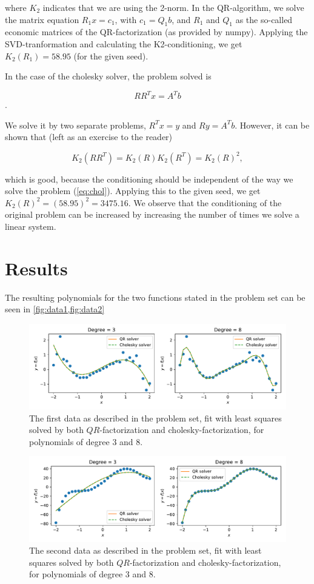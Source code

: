 \documentclass[a11paper, 10pt]{article}
\begin{document}
where $K_2$ indicates that we are using the 2-norm. In the QR-algorithm,
we solve the matrix equation $R_1x = c_1$, with $c_1 = Q_1 b$, and $R_1$
and $Q_1$ as the so-called economic matrices of the QR-factorization (as
provided by numpy). Applying the SVD-tranformation and calculating the K2-conditioning, we
get $K_2(R_1) = 58.95$ (for the given seed).

In the case of the cholesky solver, the problem solved is 

\begin{equation}
    RR^T x = A^T b
\end{equation}.

We solve it by two separate problems, $R^T x = y$ and $Ry = A^Tb$. However,
it can be shown that (left as an exercise to the reader)

\begin{equation}\label{eq:chol}
    K_2(RR^T) = K_2(R) K_2(R^T) = K_2(R)^2,
\end{equation}

which is good, because the conditioning should be independent of the way we
solve the problem (\cref{eq:chol}). Applying this to the given seed, we get
$K_2(R)^2 = (58.95)^2 = 3475.16$. We observe that the conditioning of the
original problem can be increased by increasing the number of times we
solve a linear system. 


\section{Results}

The resulting polynomials for the two functions stated in the problem set
can be seen in \cref{fig:data1,fig:data2}


\begin{figure}[htpb]
    \centering
    \includegraphics[width=0.8\linewidth]{data1.pdf}
    \caption{The first data as described in the problem set, fit with least
    squares solved by both $QR$-factorization and cholesky-factorization,
for polynomials of degree $3$ and $8$.}
    \label{fig:data1}
\end{figure}
\begin{figure}[htpb]
    \centering
    \includegraphics[width=0.8\linewidth]{data2.pdf}
    \caption{The second data as described in the problem set, fit with least
    squares solved by both $QR$-factorization and cholesky-factorization,
for polynomials of degree $3$ and $8$.}
    \label{fig:data2}
\end{figure}
\newpage


\end{document}
